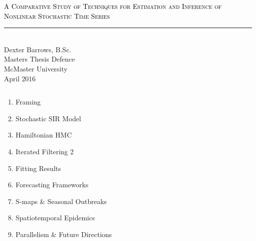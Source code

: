 \documentclass[12pt]{beamer}
\begin{document}
\begin{frame}

	\null
	\vfill
	\textcolor{black}{\textsc{\large A Comparative Study of Techniques for Estimation and Inference of Nonlinear Stochastic Time Series}} \\
	\vspace{1.5\baselineskip}
	\noindent\textcolor{black}{\rule{\textwidth}{0.4pt}} \\
	\vspace{2\baselineskip}
	Dexter Barrows, B.Sc. \\
	\vspace{1\baselineskip}
	Masters Thesis Defence \\
	McMaster University \\
	April 2016
	\vfill

\end{frame}


\begin{frame}

	\vspace{\baselineskip}
	\begin{columns}
		\begin{column}{0.8\textwidth}
			{\large
			\begin{enumerate}
				\item Framing
				\item Stochastic SIR Model
				\item Hamiltonian HMC
				\item Iterated Filtering 2
				\item Fitting Results
				\item Forecasting Frameworks
				\item S-maps \& Seasonal Outbreaks
				\item Spatiotemporal Epidemics
				\item Parallelism \& Future Directions
			\end{enumerate}
			}
		\end{column}
	\end{columns}

\end{frame}

\end{document}
